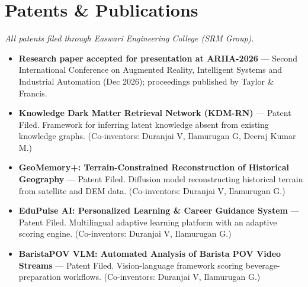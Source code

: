 \documentclass[letterpaper,10pt]{article}
\newcommand{\resumeItem}[1]{
  \item\small{#1 \vspace{-2pt}}
}
\newcommand{\resumeSubHeadingListStart}{\begin{itemize}[leftmargin=0.0in, label={}]}
\newcommand{\resumeSubHeadingListEnd}{\end{itemize}}
\begin{document}
\section{Patents \& Publications}
\small{\textit{All patents filed through Easwari Engineering College (SRM Group).}}
  \resumeSubHeadingListStart
    \resumeItem{\textbf{Research paper accepted for presentation at ARIIA-2026} --- Second International Conference on Augmented Reality, Intelligent Systems and Industrial Automation (Dec 2026); proceedings published by Taylor \& Francis.}
    \resumeItem{\textbf{Knowledge Dark Matter Retrieval Network (KDM-RN)} --- Patent Filed. Framework for inferring latent knowledge absent from existing knowledge graphs. (Co-inventors: Duranjai V, Ilamurugan G, Deeraj Kumar M.)}
    \resumeItem{\textbf{GeoMemory+: Terrain-Constrained Reconstruction of Historical Geography} --- Patent Filed. Diffusion model reconstructing historical terrain from satellite and DEM data. (Co-inventors: Duranjai V, Ilamurugan G.)}
    \resumeItem{\textbf{EduPulse AI: Personalized Learning \& Career Guidance System} --- Patent Filed. Multilingual adaptive learning platform with an adaptive scoring engine. (Co-inventors: Duranjai V, Ilamurugan G.)}
    \resumeItem{\textbf{BaristaPOV VLM: Automated Analysis of Barista POV Video Streams} --- Patent Filed. Vision-language framework scoring beverage-preparation workflows. (Co-inventors: Duranjai V, Ilamurugan G.)}
  \resumeSubHeadingListEnd

\end{document}
